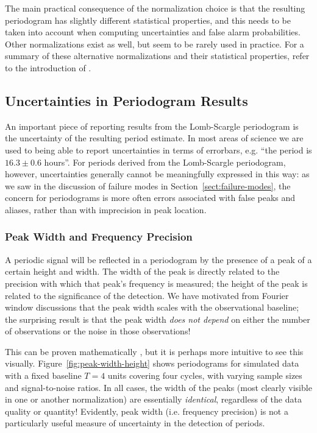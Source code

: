 \documentclass[preprint]{aastex}
\newcommand{\fig}[1]{Figure~\ref{fig:#1}}
\newcommand{\Sect}[1]{Section~\ref{sect:#1}}
\newcommand{\sect}[1]{\Sect{#1}}
\newcommand{\sectlabel}[1]{\label{sect:#1}}
\begin{document}
The main practical consequence of the normalization choice is that the
resulting periodogram has slightly different statistical properties, and
this needs to be taken into account when computing uncertainties and false
alarm probabilities.
Other normalizations exist as well, but seem to be rarely used in practice.
For a summary of these alternative normalizations and their statistical
properties, refer to the introduction of \citet{Baluev2008}.

\subsection{Uncertainties in Periodogram Results}
\sectlabel{uncertainties}
An important piece of reporting results from the Lomb-Scargle periodogram is
the uncertainty of the resulting period estimate.
In most areas of science we are used to being able to report uncertainties in
terms of errorbars, {e.g.} ``the period is $16.3 \pm 0.6$ hours''.
For periods derived from the Lomb-Scargle periodogram, however, uncertainties
generally cannot be meaningfully expressed in this way:
as we saw in the discussion of failure modes in \sect{failure-modes},
the concern for periodograms is more often errors associated with
false peaks and aliases, rather than with imprecision in peak location.

\subsubsection{Peak Width and Frequency Precision}

A periodic signal will be reflected in a periodogram by the presence of a
peak of a certain height and width.
The width of the peak is directly related to the precision with which that
peak's frequency is measured; the height of the peak 
is related to the significance of the detection.
We have motivated from Fourier window discussions that the peak width scales
with the observational baseline; the surprising result is that the peak width
{\it does not depend} on either the number of observations or the noise
in those observations!

This can be proven mathematically \citep[see, e.g.][]{Bretthorst88, ICVG2014},
but it is perhaps more intuitive to see this visually.
\fig{peak-width-height} shows periodograms for simulated data with a fixed
baseline $T=4$ units covering four cycles, with varying sample sizes and
signal-to-noise ratios.
In all cases, the width of the peaks (most clearly visible in one or another
normalization) are essentially {\it identical}, regardless of the data
quality or quantity!
Evidently, peak width ({i.e.} frequency precision) is not a particularly
useful measure of uncertainty in the detection of periods.
\end{document}
